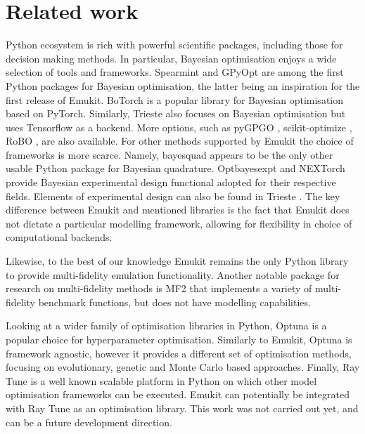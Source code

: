 \section{Related work}
Python ecosystem is rich with powerful scientific packages, including those for decision making methods. In particular, Bayesian optimisation enjoys a wide selection of tools and frameworks. Spearmint \cite{snoek2012practical} and GPyOpt \cite{gpyopt2016} are among the first Python packages for Bayesian optimisation, the latter being an inspiration for the first release of Emukit. BoTorch \cite{balandat2020botorch} is a popular library for Bayesian optimisation based on PyTorch. Similarly, Trieste \cite{picheny2023trieste} also focuses on Bayesian optimisation but uses Tensorflow as a backend. More options, such as pyGPGO \cite{jimenez2017pygpgo}, scikit-optimize \cite{louppe2017bayesian}, RoBO \cite{klein-bayesopt17}, are also available. For other methods supported by Emukit the choice of frameworks is more scarce. Namely, bayesquad \cite{Charles2013} appears to be the only other usable Python package for Bayesian quadrature. Optbayesexpt \cite{mcmichael2021optbayesexpt} and NEXTorch \cite{wang2021nextorch} provide Bayesian experimental design functional adopted for their respective fields. Elements of experimental design can also be found in Trieste \cite{picheny2023trieste}. The key difference between Emukit and mentioned libraries is the fact that Emukit does not dictate a particular modelling framework, allowing for flexibility in choice of computational backends.

Likewise, to the best of our knowledge Emukit remains the only Python library to provide multi-fidelity emulation functionality. Another notable package for research on multi-fidelity methods is MF2 \cite{vanRijn2020} that implements a variety of multi-fidelity benchmark functions, but does not have modelling capabilities.

Looking at a wider family of optimisation libraries in Python, Optuna \cite{optuna_2019} is a popular choice for hyperparameter optimisation. Similarly to Emukit, Optuna is framework agnostic, however it provides a different set of optimisation methods, focusing on evolutionary, genetic and Monte Carlo based approaches. Finally, Ray Tune \cite{liaw2018tune} is a well known scalable platform in Python on which other model optimisation frameworks can be executed. Emukit can potentially be integrated with Ray Tune as an optimisation library. This work was not carried out yet, and can be a future development direction.


